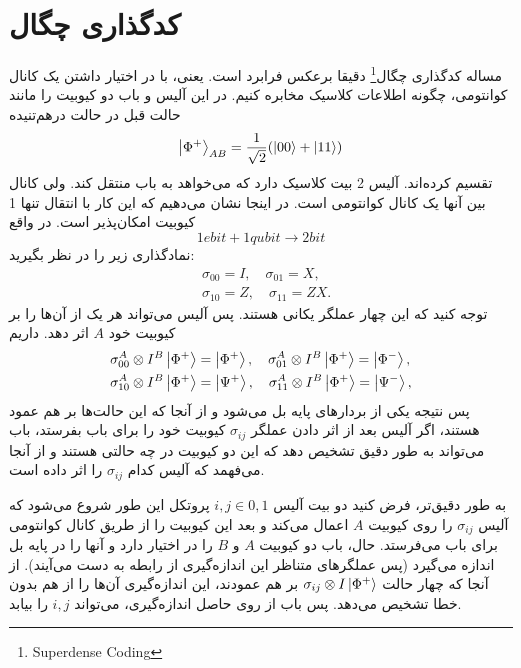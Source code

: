 \section{کدگذاری چگال}
مساله کدگذاری چگال\footnote{Superdense Coding} دقیقا برعکس فرابرد است. یعنی، با در اختیار داشتن یک کانال کوانتومی، چگونه اطلاعات کلاسیک مخابره کنیم. در این آلیس و باب دو کیوبیت را مانند حالت قبل در حالت درهم‌تنیده 
 \begin{equation}
 \ket{\Phi^{+}}_{AB} = \frac{1}{\sqrt{2}} (\ket{00} + \ket{11} )
 \end{equation}
 تقسیم کرده‌اند. آلیس 2 بیت کلاسیک دارد که می‌خواهد به باب منتقل کند. ولی کانال بین آنها یک کانال کوانتومی است.   در اینجا نشان می‌دهیم که این کار با انتقال تنها 1 کیوبیت امکان‌پذیر است. در واقع
    \begin{equation}
  	1 ebit + 1 qubit \rightarrow 2 bit
\end{equation} 
نمادگذاری زیر را در نظر بگیرید: 
\begin{equation}
	\begin{split}
		& \sigma_{00} = I, \quad \sigma_{01} = X, \\
		& \sigma_{10} = Z, \quad \sigma_{11} = ZX.
	\end{split}
\end{equation}
توجه کنید که این چهار عملگر یکانی هستند. پس آلیس می‌تواند هر یک از آن‌ها را بر کیوبیت خود $A$ اثر دهد. داریم
\begin{equation}
	\begin{split}
		& \sigma_{00}^{A} \otimes I^{B}\ket{\Phi^{+}} = \ket{\Phi^{+}}, \quad \sigma_{01}^{A} \otimes I^{B}\ket{\Phi^{+}} = \ket{\Phi^{-}}, \\
		& \sigma_{10}^{A} \otimes I^{B}\ket{\Phi^{+}} = \ket{\Psi^{+}}, \quad \sigma_{11}^{A} \otimes I^{B}\ket{\Phi^{+}} = \ket{\Psi^{-}}, \\
	\end{split}
\end{equation}
پس نتیجه یکی از بردارهای پایه بل می‌شود و از آنجا که این حالت‌ها بر هم عمود هستند، اگر آلیس بعد از اثر دادن عملگر $\sigma_{ij}$ کیوبیت خود را برای باب بفرستد، باب می‌تواند به طور دقیق تشخیص دهد که این دو کیوبیت در چه حالتی هستند و از آنجا می‌فهمد که آلیس کدام $\sigma_{ij}$ را اثر داده است. 

به طور دقیق‌تر، فرض کنید دو بیت آلیس $i,j \in {0,1}$ پروتکل این طور شروع می‌شود که آلیس $\sigma_{ij}$ را روی کیوبیت $A$  اعمال می‌کند و بعد این کیوبیت را از طریق کانال کوانتومی برای باب می‌فرستد. حال، باب  دو کیوبیت $A$ و  $B$ را در اختیار دارد و آنها را در پایه بل اندازه می‌گیرد (پس عملگرهای متناظر این اندازه‌گیری از رابطه به دست می‌آیند).  از آنجا که چهار حالت $\sigma_{ij} \otimes I\ket{\Phi^{+}}$ بر هم عمودند، این اندازه‌گیری آن‌ها را از هم بدون خطا تشخیص می‌دهد. پس باب از روی حاصل اندازه‌گیری، می‌تواند $i,j$ را بیابد. 

